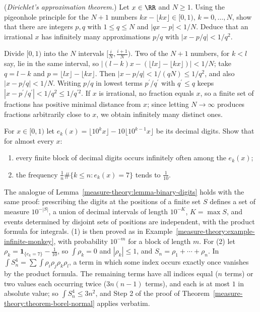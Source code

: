 \begin{exercise}\label{measure-theory:exercise-dirichlet-approximation}
(\emph{Dirichlet's approximation theorem.}) Let $x \in \RR$ and $N \geq 1$. Using the pigeonhole principle for the $N + 1$ numbers $kx - \lfloor kx\rfloor \in [0, 1)$, $k = 0, \ldots, N$, show that there
are integers $p, q$ with $1 \leq q \leq N$ and $|qx - p| < 1/N$. Deduce that an irrational $x$ has infinitely many approximations $p/q$ with $|x - p/q| < 1/q^2$.
\end{exercise}

\begin{solution}
Divide $[0, 1)$ into the $N$ intervals $[\frac{i}{N}, \frac{i+1}{N})$. Two of the $N + 1$ numbers, for $k < l$ say, lie in the same interval, so $|(l - k)x - (\lfloor lx\rfloor - \lfloor kx\rfloor)| < 1/N$; take
$q = l - k$ and $p = \lfloor lx\rfloor - \lfloor kx\rfloor$. Then $|x - p/q| < 1/(qN) \leq 1/q^2$, and also $|x - p/q| < 1/N$. Writing $p/q$ in lowest terms $p^{\prime}/q^{\prime}$ with $q^{\prime} \leq q$ keeps
$|x - p^{\prime}/q^{\prime}| < 1/q^2 \leq 1/q^{\prime 2}$. If $x$ is irrational, no fraction equals $x$, so a finite set of fractions has positive minimal distance from $x$; since letting $N \to \infty$ produces
fractions arbitrarily close to $x$, we obtain infinitely many distinct ones.
\end{solution}

\begin{exercise}\label{measure-theory:exercise-decimal-blocks}
For $x \in [0, 1)$ let $e_k(x) = \lfloor 10^kx\rfloor - 10\lfloor 10^{k-1}x\rfloor$ be its decimal digits. Show that for almost every $x$:
\begin{enumerate}
\item every finite block of decimal digits occurs infinitely often among the $e_k(x)$;
\item the frequency $\frac1n\#\{k \leq n : e_k(x) = 7\}$ tends to $\frac1{10}$.
\end{enumerate}
\end{exercise}

\begin{solution}
The analogue of Lemma~\ref{measure-theory:lemma-binary-digits} holds with the same proof: prescribing the digits at the positions of a finite set $S$ defines a set of measure $10^{-|S|}$, a union of
decimal intervals of length $10^{-K}$, $K = \max S$, and events determined by disjoint sets of positions are independent, with the product formula for integrals. (1) is then proved as in
Example~\ref{measure-theory:example-infinite-monkey}, with probability $10^{-m}$ for a block of length $m$. For (2) let $\rho_k = \mathbf{1}_{\{e_k = 7\}} - \frac1{10}$, so $\int\rho_k = 0$ and $|\rho_k| \leq 1$, and
$S_n = \rho_1 + \cdots + \rho_n$. In $\int S_n^4 = \sum\int\rho_i\rho_j\rho_k\rho_l$, a term in which some index occurs exactly once vanishes by the product formula. The remaining terms have all indices equal
($n$ terms) or two values each occurring twice ($3n(n - 1)$ terms), and each is at most $1$ in absolute value; so $\int S_n^4 \leq 3n^2$, and Step 2 of the proof of
Theorem~\ref{measure-theory:theorem-borel-normal} applies verbatim.
\end{solution}

